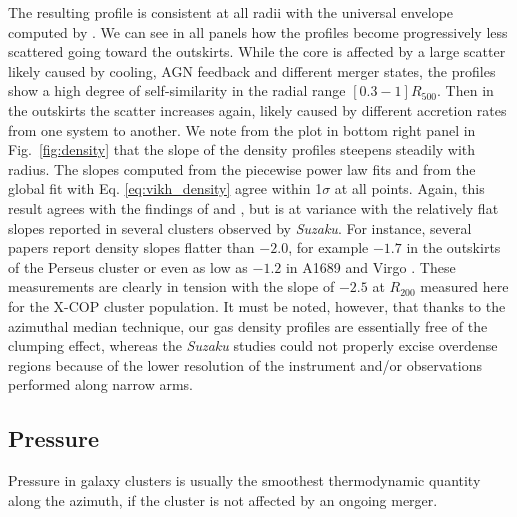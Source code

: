 \documentclass[traditabstract   ]{aa} %
\begin{document}
The resulting profile is consistent at all radii with the universal envelope computed by \citet{eckert12}. We can see in all panels how the profiles become progressively less scattered going toward the outskirts. While the core is affected by a large scatter likely caused by cooling, AGN feedback and different merger states, the profiles show a high degree of self-similarity in the radial range $[0.3-1]R_{500}$. { Then in the outskirts the scatter increases again, likely caused by different accretion rates from one system to another.} We note from the plot in bottom right panel in Fig.~\ref{fig:density} that the slope of the density profiles steepens steadily with radius. The slopes computed from the piecewise power law fits and from the global fit with Eq. \ref{eq:vikh_density} agree within 1$\sigma$ at all points. Again, this result  agrees with the findings of \citet{eckert12} and \citet{morandi15}, but is at variance with the relatively flat slopes reported in several clusters observed by \emph{Suzaku}. For instance, several papers report density slopes flatter than $-2.0$, for example $-1.7$ in the outskirts of the Perseus cluster \citep{urban14} or even as low as $-1.2$ in A1689 \citep{kawa10} and Virgo \citep{simi17}. These measurements are clearly in tension with the slope of $-2.5$ at $R_{200}$ measured here for the X-COP cluster population. It must be noted, however, that thanks to  the azimuthal median technique, our gas density profiles are essentially free of the clumping effect, whereas the \emph{Suzaku} studies could not properly excise overdense regions because of the lower resolution of the instrument and/or observations performed along narrow arms.

\subsection{Pressure}
\label{sec:pressure}
Pressure in galaxy clusters is usually the smoothest thermodynamic quantity along the azimuth, if the cluster is not affected by an ongoing merger.%
\end{document}
